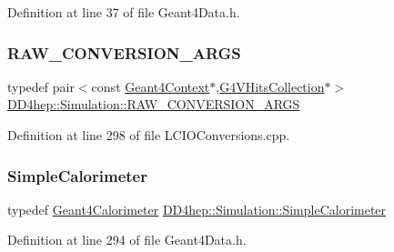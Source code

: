 Definition at line 37 of file Geant4\+Data.\+h.

\hypertarget{namespace_d_d4hep_1_1_simulation_a9202b8807ca8dc9a21546a337d2fbc83}{}\label{namespace_d_d4hep_1_1_simulation_a9202b8807ca8dc9a21546a337d2fbc83} 
\subsubsection{\texorpdfstring{R\+A\+W\+\_\+\+C\+O\+N\+V\+E\+R\+S\+I\+O\+N\+\_\+\+A\+R\+GS}{RAW\_CONVERSION\_ARGS}}
{\footnotesize\ttfamily typedef pair$<$const \hyperlink{class_d_d4hep_1_1_simulation_1_1_geant4_context}{Geant4\+Context}$\ast$,\hyperlink{class_g4_v_hits_collection}{G4\+V\+Hits\+Collection}$\ast$$>$ \hyperlink{namespace_d_d4hep_1_1_simulation_a9202b8807ca8dc9a21546a337d2fbc83}{D\+D4hep\+::\+Simulation\+::\+R\+A\+W\+\_\+\+C\+O\+N\+V\+E\+R\+S\+I\+O\+N\+\_\+\+A\+R\+GS}}



Definition at line 298 of file L\+C\+I\+O\+Conversions.\+cpp.

\hypertarget{namespace_d_d4hep_1_1_simulation_a05940f87d83b165713f6c92d7cd9425f}{}\label{namespace_d_d4hep_1_1_simulation_a05940f87d83b165713f6c92d7cd9425f} 
\subsubsection{\texorpdfstring{Simple\+Calorimeter}{SimpleCalorimeter}}
{\footnotesize\ttfamily typedef \hyperlink{class_d_d4hep_1_1_simulation_1_1_geant4_calorimeter}{Geant4\+Calorimeter} \hyperlink{namespace_d_d4hep_1_1_simulation_a05940f87d83b165713f6c92d7cd9425f}{D\+D4hep\+::\+Simulation\+::\+Simple\+Calorimeter}}



Definition at line 294 of file Geant4\+Data.\+h.

\hypertarget{namespace_d_d4hep_1_1_simulation_a0a561b07f32c81b4365bdc61e74e645b}{}\label{namespace_d_d4hep_1_1_simulation_a0a561b07f32c81b4365bdc61e74e645b} 
